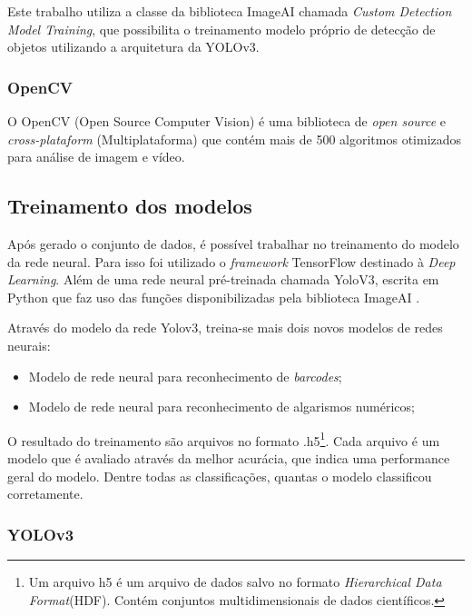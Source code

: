 Este trabalho utiliza a classe da biblioteca ImageAI chamada \textit{Custom Detection Model Training}, que possibilita o treinamento modelo próprio de detecção de objetos utilizando a arquitetura da YOLOv3.


\subsubsection{OpenCV}

O OpenCV (Open Source Computer Vision) é uma biblioteca de \textit{open source} e \textit{cross-plataform} (Multiplataforma) que contém mais de 500 algoritmos otimizados para análise de imagem e vídeo. \cite{opencv}


\subsection{Treinamento dos modelos}

Após gerado o conjunto de dados, é possível trabalhar no treinamento do modelo da rede neural. Para isso foi utilizado o \textit{framework} TensorFlow destinado à \textit{Deep Learning}. Além de uma rede neural pré-treinada chamada YoloV3, escrita em Python que faz uso das funções disponibilizadas pela biblioteca ImageAI .

Através do modelo da rede Yolov3, treina-se mais dois novos modelos de redes neurais:
\begin{itemize}
    \item Modelo de rede neural para reconhecimento de \textit{barcodes};
    \item Modelo de rede neural para reconhecimento de algarismos numéricos;
\end{itemize}

O resultado do treinamento são arquivos no formato .h5\footnote{Um arquivo h5 é um arquivo de dados salvo no formato \textit{Hierarchical Data Format}(HDF). Contém conjuntos multidimensionais de dados científicos.}. Cada arquivo é um modelo que é avaliado através da melhor acurácia, que indica uma performance geral do modelo. Dentre todas as classificações, quantas o modelo classificou corretamente.


\subsubsection*{YOLOv3}\label{sub:Yolov3}

